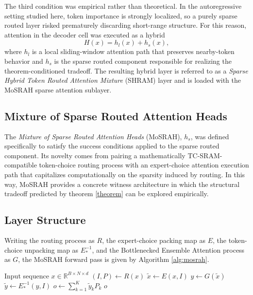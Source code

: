 \documentclass[11pt]{article}
\begin{document}
The third condition was empirical rather than theoretical. In the autoregressive setting studied here, token importance is strongly localized, so a purely sparse routed layer risked prematurely discarding short-range structure. For this reason, attention in the decoder cell was executed as a hybrid
\[
H(x) = h_l(x) + h_s(x),
\]
where $h_l$ is a local sliding-window attention path that preserves nearby-token behavior and $h_s$ is the sparse routed component responsible for realizing the theorem-conditioned tradeoff. The resulting hybrid layer is referred to as a \emph{Sparse Hybrid Token Routed Attention Mixture} (SHRAM) layer and is loaded with the MoSRAH sparse attention sublayer.

\subsection{Mixture of Sparse Routed Attention Heads}
\label{sec:design_mosrah}

The \emph{Mixture of Sparse Routed Attention Heads} (MoSRAH), $h_s$, was defined specifically to satisfy the success conditions applied to the sparse routed component. Its novelty comes from pairing a mathematically TC-SRAM-compatible token-choice routing process with an expert-choice attention execution path that capitalizes computationally on the sparsity induced by routing. In this way, MoSRAH provides a concrete witness architecture in which the structural tradeoff predicted by theorem \ref{theorem} can be explored empirically.

\subsection{Layer Structure}
\label{sec:design_structure}

Writing the routing process as $R$, the expert-choice packing map as $E$, the token-choice unpacking map as $E_*^{-1}$, and the Bottlenecked Ensemble Attention process as $G$, the MoSRAH forward pass is given by Algorithm \ref{alg:mosrah}.

\begin{algorithm}[H]
\caption{MoSRAH Forward Pass}
\label{alg:mosrah}
\begin{algorithmic}[1]
\Require Input sequence $x \in \mathbb{R}^{B \times N \times d}$
\State $(I, P) \gets R(x)$ 
\State $\tilde{x} \gets E(x, I)$ 
\State $y \gets G(\tilde{x})$ 
\State $\tilde{y} \gets E_*^{-1}(y, I)$ 
\State $o \gets \sum_{k=1}^{K} \tilde{y}_k P_k$ 
\State \Return $o$
\end{algorithmic}
\end{algorithm}
\end{document}
